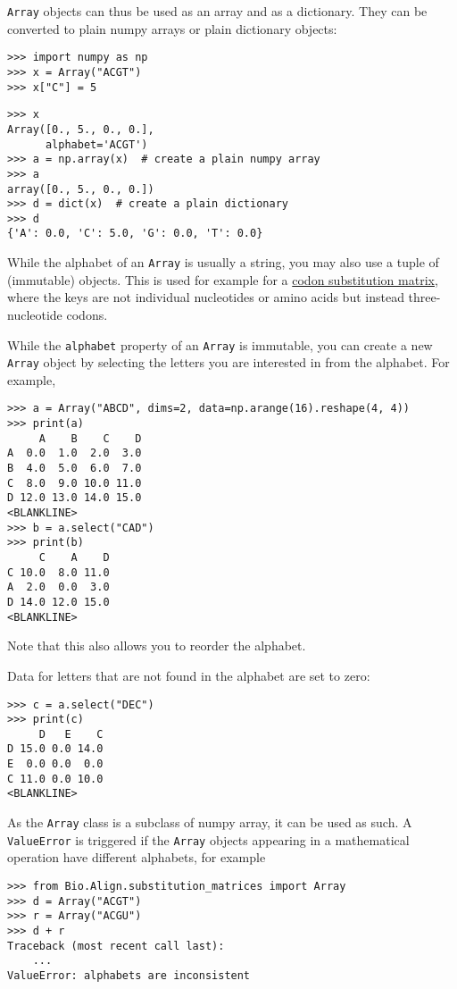 \verb+Array+ objects can thus be used as an array and as a dictionary. They can be converted to plain numpy arrays or plain dictionary objects:

\begin{verbatim}
>>> import numpy as np
>>> x = Array("ACGT")
>>> x["C"] = 5
\end{verbatim}
\begin{verbatim}
>>> x
Array([0., 5., 0., 0.],
      alphabet='ACGT')
>>> a = np.array(x)  # create a plain numpy array
>>> a
array([0., 5., 0., 0.])
>>> d = dict(x)  # create a plain dictionary
>>> d
{'A': 0.0, 'C': 5.0, 'G': 0.0, 'T': 0.0}
\end{verbatim}

While the alphabet of an \verb+Array+ is usually a string, you may also use a tuple of (immutable) objects. This is used for example for a \hyperlink{codonmatrix}{codon substitution matrix}, where the keys are not individual nucleotides or amino acids but instead three-nucleotide codons.

While the \verb+alphabet+ property of an \verb+Array+ is immutable, you can create a new \verb+Array+ object by selecting the letters you are interested in from the alphabet. For example,
\begin{verbatim}
>>> a = Array("ABCD", dims=2, data=np.arange(16).reshape(4, 4))
>>> print(a)
     A    B    C    D
A  0.0  1.0  2.0  3.0
B  4.0  5.0  6.0  7.0
C  8.0  9.0 10.0 11.0
D 12.0 13.0 14.0 15.0
<BLANKLINE>
>>> b = a.select("CAD")
>>> print(b)
     C    A    D
C 10.0  8.0 11.0
A  2.0  0.0  3.0
D 14.0 12.0 15.0
<BLANKLINE>
\end{verbatim}
Note that this also allows you to reorder the alphabet.

Data for letters that are not found in the alphabet are set to zero:
\begin{verbatim}
>>> c = a.select("DEC")
>>> print(c)
     D   E    C
D 15.0 0.0 14.0
E  0.0 0.0  0.0
C 11.0 0.0 10.0
<BLANKLINE>
\end{verbatim}

As the \verb+Array+ class is a subclass of numpy array, it can be used as such. A \verb+ValueError+ is triggered if the \verb+Array+ objects appearing in a mathematical operation have different alphabets, for example

\begin{verbatim}
>>> from Bio.Align.substitution_matrices import Array
>>> d = Array("ACGT")
>>> r = Array("ACGU")
>>> d + r
Traceback (most recent call last):
    ...
ValueError: alphabets are inconsistent
\end{verbatim}

